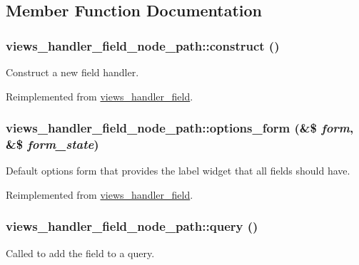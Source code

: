 \subsection{Member Function Documentation}
\hypertarget{classviews__handler__field__node__path_a9f8110039f0e7f6bb87792c222c7fd06}{
\subsubsection[{construct}]{\setlength{\rightskip}{0pt plus 5cm}views\_\-handler\_\-field\_\-node\_\-path::construct ()}}
\label{classviews__handler__field__node__path_a9f8110039f0e7f6bb87792c222c7fd06}
Construct a new field handler. 

Reimplemented from \hyperlink{classviews__handler__field_a3d50050864c255b71c842972a45d39f6}{views\_\-handler\_\-field}.\hypertarget{classviews__handler__field__node__path_af0eb803f6004582da8a3b4aa9e81cedf}{
\subsubsection[{options\_\-form}]{\setlength{\rightskip}{0pt plus 5cm}views\_\-handler\_\-field\_\-node\_\-path::options\_\-form (\&\$ {\em form}, \/  \&\$ {\em form\_\-state})}}
\label{classviews__handler__field__node__path_af0eb803f6004582da8a3b4aa9e81cedf}
Default options form that provides the label widget that all fields should have. 

Reimplemented from \hyperlink{classviews__handler__field_a0435d161922b7b4b84f02a2e79bb947a}{views\_\-handler\_\-field}.\hypertarget{classviews__handler__field__node__path_a59474fa6e78296b5f0c2aca6a951907e}{
\subsubsection[{query}]{\setlength{\rightskip}{0pt plus 5cm}views\_\-handler\_\-field\_\-node\_\-path::query ()}}
\label{classviews__handler__field__node__path_a59474fa6e78296b5f0c2aca6a951907e}
Called to add the field to a query. 

